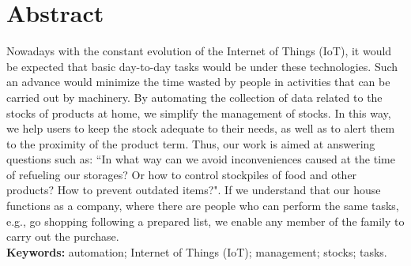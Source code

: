 \cleardoublepage\newpage
\chapter*{Abstract} \label{abstract}

Nowadays with the constant evolution of the Internet of Things (IoT), it would be expected that basic day-to-day tasks would be under these technologies. Such an advance would minimize the time wasted by people in activities that can be carried out by machinery. By automating the collection of data related to the stocks of products at home, we simplify the management of stocks. In this way, we help users to keep the stock adequate to their needs, as well as to alert them to the proximity of the product term. Thus, our work is aimed at answering questions such as: ``In what way can we avoid inconveniences caused at the time of refueling our storages? Or how to control stockpiles of food and other products? How to prevent outdated items?". If we understand that our house functions as a company, where there are people who can perform the same tasks, e.g., go shopping following a prepared list, we enable any member of the family to carry out the purchase.\\

{\bf Keywords:} automation; Internet of Things (IoT); management; stocks; tasks.